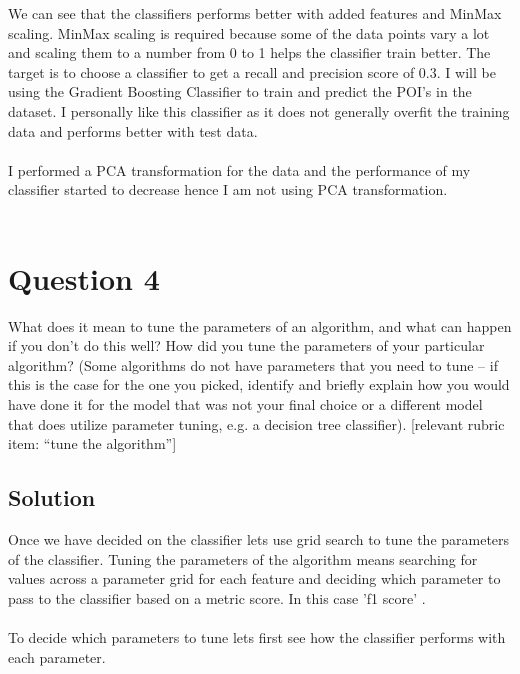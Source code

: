 \documentclass[12pt]{article}%
\begin{document}
\begin{figure}[!htbp]
\centering
\end{figure}
\newpage
We can see that the classifiers performs better with added features and MinMax scaling. MinMax scaling is required because some of the data points vary a lot and scaling them to a number from 0 to 1 helps the classifier train better. The target is to choose a classifier to get a recall and precision score of 0.3. I will be using the Gradient Boosting Classifier to train and predict the POI's in the dataset. I personally like this classifier as it does not generally overfit the training data and performs better with test data.
\\
\\
I performed a PCA transformation for the data and the performance of my classifier started to decrease hence I am not using PCA transformation.
\\
\\
\newpage
\section*{Question 4}
What does it mean to tune the parameters of an algorithm, and what can happen if you don’t do this well?  How did you tune the parameters of your particular algorithm? (Some algorithms do not have parameters that you need to tune -- if this is the case for the one you picked, identify and briefly explain how you would have done it for the model that was not your final choice or a different model that does utilize parameter tuning, e.g. a decision tree classifier).  [relevant rubric item: “tune the algorithm”]

\subsection*{Solution}
Once we have decided on the classifier lets use grid search to tune the parameters of the classifier. Tuning the parameters of the algorithm means searching for values across a parameter grid for each feature and deciding which parameter to pass to the classifier based on a metric score. In this case 'f1 score' .
\\
\\
To decide which parameters to tune lets first see how the classifier performs with each parameter.
\end{document}
